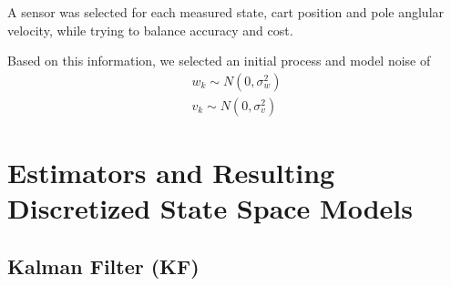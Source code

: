 \documentclass{article}
\begin{document}
A sensor was selected for each measured state, cart position and pole anglular velocity, while trying to balance accuracy and cost.

Based on this information, we selected an initial process and model noise of
\begin{equation}
\begin{aligned}
w_k \sim N(0,\sigma_w^2) \\
v_k \sim N(0,\sigma_v^2)
\end{aligned}
\end{equation}

\section{Estimators and Resulting Discretized State Space Models}
\subsection{Kalman Filter (KF)}
\end{document}
